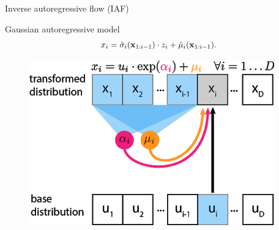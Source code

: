 \begin{frame}{Inverse autoregressive flow (IAF)}

	\begin{minipage}[t]{0.65\columnwidth}
		\begin{block}{Gaussian autoregressive model}
			\[
			x_i = \hat{\sigma}_i (\mathbf{x}_{1:i-1}) \cdot z_i + \hat{\mu}_i(\mathbf{x}_{1:i-1}).
			\]
		\end{block}
	\end{minipage}%
	\begin{minipage}[t]{0.35\columnwidth}
		\begin{figure}[h]
			\centering
			\includegraphics[width=.9\linewidth]{figs/maf_iaf_explained_1.png}
		\end{figure}
	\end{minipage} \\
	

\end{frame}

